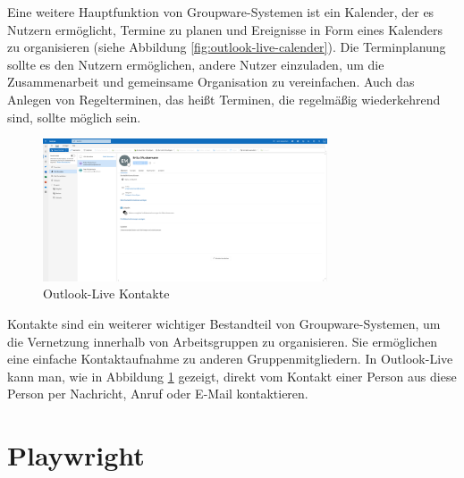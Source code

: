 Eine weitere Hauptfunktion von Groupware-Systemen ist ein Kalender, der es Nutzern ermöglicht, Termine zu planen und Ereignisse in Form eines Kalenders zu organisieren (siehe Abbildung \ref{fig:outlook-live-calender}).
Die Terminplanung sollte es den Nutzern ermöglichen, andere Nutzer einzuladen, um die Zusammenarbeit und gemeinsame Organisation zu vereinfachen.
Auch das Anlegen von Regelterminen, das heißt Terminen, die regelmäßig wiederkehrend sind, sollte möglich sein.

\begin{figure}[H]
    \centering
    \includegraphics[width=0.75\textwidth]{images/OutlookLive_Contacts.png}
    \caption{Outlook-Live Kontakte}
    \label{fig:outlook-live-contacts}
\end{figure}

Kontakte sind ein weiterer wichtiger Bestandteil von Groupware-Systemen, um die Vernetzung innerhalb von Arbeitsgruppen zu organisieren.
Sie ermöglichen eine einfache Kontaktaufnahme zu anderen Gruppenmitgliedern.
In Outlook-Live kann man, wie in Abbildung \ref{fig:outlook-live-contacts} gezeigt, direkt vom Kontakt einer Person aus diese Person per Nachricht, Anruf oder E-Mail kontaktieren.


\section{Playwright}


